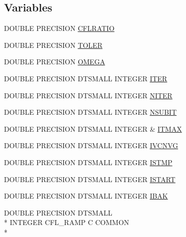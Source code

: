 \subsection*{Variables}
\begin{DoxyCompactItemize}
\item 
D\-O\-U\-B\-L\-E P\-R\-E\-C\-I\-S\-I\-O\-N \hyperlink{conv_8com_afddb47408d5e35303a408fd28821caa1}{C\-F\-L\-R\-A\-T\-I\-O}
\item 
D\-O\-U\-B\-L\-E P\-R\-E\-C\-I\-S\-I\-O\-N \hyperlink{conv_8com_a695d875d45bd834620ef52158325ca2a}{T\-O\-L\-E\-R}
\item 
D\-O\-U\-B\-L\-E P\-R\-E\-C\-I\-S\-I\-O\-N \hyperlink{conv_8com_a27b76f3b783d9cc5fffe85f1e22ecb89}{O\-M\-E\-G\-A}
\item 
D\-O\-U\-B\-L\-E P\-R\-E\-C\-I\-S\-I\-O\-N D\-T\-S\-M\-A\-L\-L I\-N\-T\-E\-G\-E\-R \hyperlink{conv_8com_a5e8268d7a99a27a3889882b8cb685176}{I\-T\-E\-R}
\item 
D\-O\-U\-B\-L\-E P\-R\-E\-C\-I\-S\-I\-O\-N D\-T\-S\-M\-A\-L\-L I\-N\-T\-E\-G\-E\-R \hyperlink{conv_8com_a0a434a625bddcbee262d330f471d5b54}{N\-I\-T\-E\-R}
\item 
D\-O\-U\-B\-L\-E P\-R\-E\-C\-I\-S\-I\-O\-N D\-T\-S\-M\-A\-L\-L I\-N\-T\-E\-G\-E\-R \hyperlink{conv_8com_aceeea16657a8729e23a6145062b0af71}{N\-S\-U\-B\-I\-T}
\item 
D\-O\-U\-B\-L\-E P\-R\-E\-C\-I\-S\-I\-O\-N D\-T\-S\-M\-A\-L\-L I\-N\-T\-E\-G\-E\-R \& \hyperlink{conv_8com_aed14565252ecc7b0d32f2e1eece0e781}{I\-T\-M\-A\-X}
\item 
D\-O\-U\-B\-L\-E P\-R\-E\-C\-I\-S\-I\-O\-N D\-T\-S\-M\-A\-L\-L I\-N\-T\-E\-G\-E\-R \hyperlink{conv_8com_acef83c369dada2c28e14e0bbf42054cf}{I\-V\-C\-N\-V\-G}
\item 
D\-O\-U\-B\-L\-E P\-R\-E\-C\-I\-S\-I\-O\-N D\-T\-S\-M\-A\-L\-L I\-N\-T\-E\-G\-E\-R \hyperlink{conv_8com_a6a9285d211dcd0595d66dcbd00736595}{I\-S\-T\-M\-P}
\item 
D\-O\-U\-B\-L\-E P\-R\-E\-C\-I\-S\-I\-O\-N D\-T\-S\-M\-A\-L\-L I\-N\-T\-E\-G\-E\-R \hyperlink{conv_8com_a860a2b695f2e90fdf11124cedcd72ef6}{I\-S\-T\-A\-R\-T}
\item 
D\-O\-U\-B\-L\-E P\-R\-E\-C\-I\-S\-I\-O\-N D\-T\-S\-M\-A\-L\-L I\-N\-T\-E\-G\-E\-R \hyperlink{conv_8com_aab06481a8652a66f0849ac8bba3eadca}{I\-B\-A\-K}
\item 
D\-O\-U\-B\-L\-E P\-R\-E\-C\-I\-S\-I\-O\-N D\-T\-S\-M\-A\-L\-L \\*
I\-N\-T\-E\-G\-E\-R C\-F\-L\-\_\-\-R\-A\-M\-P C C\-O\-M\-M\-O\-N \\*

\end{DoxyCompactItemize}

